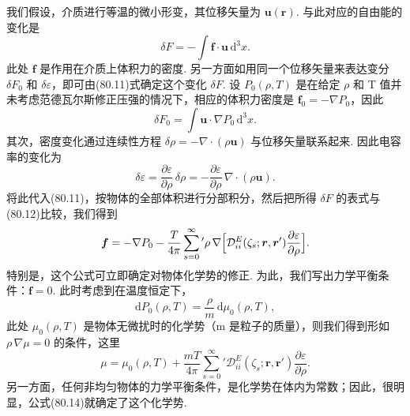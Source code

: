 我们假设，介质进行等温的微小形变，其位移矢量为 $\bm{u}(\bm{r})$. 与此对应的自由能的变化是
\begin{equation}
  \delta F=-\int\bm{f}\cdot\bm{u}\,\mathrm{d}^{3}x.
\end{equation}
此处 $\bm{f}$ 是作用在介质上体积力的密度. 另一方面如用同一个位移矢量来表达变分 $\delta F_0$ 和 $\delta\varepsilon$，即可由(80.11)式确定这个变化 $\delta F$. 设 $P_0(\rho,T)$ 是在给定 $\rho$ 和 T
值并未考虑范德瓦尔斯修正压强的情况下，相应的体积力密度是 $\bm{f}_0=-\nabla P_0$，因此
\begin{equation*}
  \delta F_0=\int\bm{u}\cdot\nabla P_0\,\mathrm{d}^{3}x.
\end{equation*}
其次，密度变化通过连续性方程 $\delta\rho=-\nabla\cdot(\rho\bm{u})$ 与位移矢量联系起来. 因此电容率的变化为
\begin{equation*}
  \delta\varepsilon=\frac{\partial\varepsilon}{\partial\rho}\,\delta\rho=-\frac{\partial\varepsilon}{\partial\rho}\,\nabla\cdot(\rho\bm{u}).
\end{equation*}
将此代入(80.11)，按物体的全部体积进行分部积分，然后把所得 $\delta F$ 的表式与(80.12)比较，我们得到
\begin{equation}
  \bm{f}=-\nabla P_0-\frac{T}{4\pi}\sum_{s=0}^{\infty}{}'\rho\,\nabla\Bigl[\mathcal{D}^{E}_{ii}(\zeta_s;\bm{r},\bm{r}')\frac{\partial\varepsilon}{\partial\rho}\Bigr].
\end{equation}
特别是，这个公式可立即确定对物体化学势的修正. 为此，我们写出力学平衡条件：$\bm{f}=0$. 此时考虑到在温度恒定下，
\begin{equation*}
  \mathrm{d}P_0(\rho,T)=\frac{\rho}{m}\,\mathrm{d}\mu_0(\rho,T),
\end{equation*}
此处 $\mu_0(\rho,T)$ 是物体无微扰时的化学势（m 是粒子的质量），则我们得到形如 $\rho\,\nabla\mu=0$ 的条件，这里
\begin{equation}
  \mu=\mu_0(\rho,T)+\frac{mT}{4\pi}\sum_{s=0}^{\infty}{}'\mathcal{D}^{E}_{ii}(\zeta_s;\bm{r},\bm{r}')\frac{\partial\varepsilon}{\partial\rho}.
\end{equation}
另一方面，任何非均匀物体的力学平衡条件，是化学势在体内为常数；因此，很明显，公式(80.14)就确定了这个化学势.

